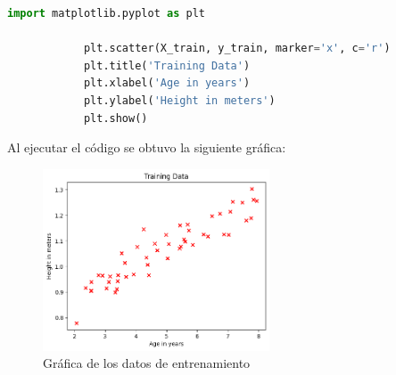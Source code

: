 \documentclass{article}
\begin{document}
    \begin{lstlisting}[language=Python, caption={Gráfica de los datos de entrenamiento},label={lst:PlotTrainingData}]
            import matplotlib.pyplot as plt

            plt.scatter(X_train, y_train, marker='x', c='r')
            plt.title('Training Data')
            plt.xlabel('Age in years')
            plt.ylabel('Height in meters')
            plt.show()
    \end{lstlisting}
    \noindent
    Al ejecutar el código se obtuvo la siguiente gráfica:
    \begin{figure}[h]
        \centering
        \includegraphics[width=0.6\textwidth]{img/plot_training_data}
        \caption{Gráfica de los datos de entrenamiento}
        \label{fig:plot_training_data}
    \end{figure}

\end{document}
